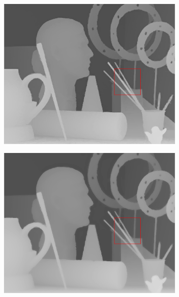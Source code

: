 \documentclass[preprint,10pt,5p,times,twocolumn]{elsarticle}
\begin{document}
\begin{figure}[t]
\begin{center}
\vspace{-0.3cm}
\begin{subfigure}[b]{0.136\linewidth}
    \includegraphics[width=\linewidth]{cmp_art_8X_JG.png}
    \label{fig:}
\end{subfigure}
\begin{subfigure}[b]{0.136\linewidth}
    \includegraphics[width=\linewidth]{cmp_art_8X_NLA.png}

\end{subfigure}
\end{center}
\end{figure}
\end{document}
